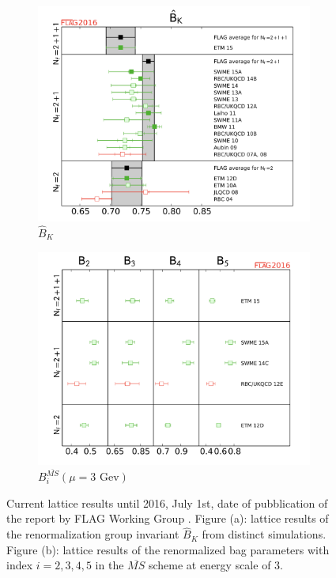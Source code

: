 \documentclass[english, LaM, oneside, noexaminfo]{sapthesis}
\newcommand{\gev}{\text{ GeV}}
\begin{document}
\begin{figure}[h!]
    \centering
    \begin{subfigure}[b]{0.49\textwidth}
        \centering
        \includegraphics[width=\textwidth]{imgs-MSc-thesis/flag-Bk.png}
        \caption{$\hat B_K$}
    \end{subfigure}
    \begin{subfigure}[b]{0.49\textwidth}
        \centering
        \includegraphics[width=\textwidth]{imgs-MSc-thesis/flag-Bi.png}
        \caption{$B_i^{\overline{MS}} (\mu = 3 \text{ Gev})$}
    \end{subfigure}
    \caption{Current lattice results until 2016, July 1st, date of pubblication of the report by FLAG Working Group \cite{FLAG}.
        Figure (a): lattice results of the renormalization group invariant $\hat B_K$ from distinct simulations.
        Figure (b): lattice results of the renormalized bag parameters with index $i = 2,3,4,5$ in the $\overline{MS}$ scheme at energy scale of 3\gev.}
    \label{fig:bag-parameters}
\end{figure}
\end{document}
